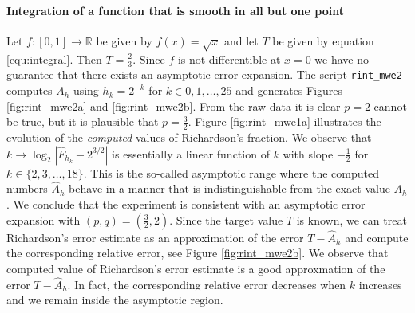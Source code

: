 \documentclass[runningheads]{llncs}
\begin{document}
\paragraph{Integration of a function that is smooth in all but one point}

Let $f : [0,1] \rightarrow \mathbb{R}$ be given by $f(x) = \sqrt{x}$ and let $T$ be given by equation \eqref{equ:integral}.
Then $T = \frac{2}{3}$. Since $f$ is not differentible at $x=0$ we have no guarantee that there exists an asymptotic error expansion.
The script {\tt rint\_mwe2} computes $A_h$ using $h_k = 2^{-k}$ for $k \in {0,1,\dots,25}$ and generates Figures \ref{fig:rint_mwe2a} and \ref{fig:rint_mwe2b}.
From the raw data it is clear $p = 2$ cannot be true, but it is plausible that $p = \frac{3}{2}$.
Figure \ref{fig:rint_mwe1a} illustrates the evolution of the \emph{computed} values of Richardson's fraction.
We observe that $k \rightarrow \log_2|\hat{F}_{h_k} - 2^{3/2}|$ is essentially a linear function of $k$ with slope $-\frac{1}{2}$ for $k \in \{2,3,\dots,18\}$.
This is the so-called asymptotic range where the computed numbers $\hat{A}_h$ behave in a manner that is indistinguishable from the exact value $A_h$.
We conclude that the experiment is consistent with an asymptotic error expansion with $(p,q)=(\tfrac{3}{2},2)$.
Since the target value $T$ is known, we can treat Richardson's error estimate as an approximation of the error $T-\hat{A}_h$ and compute the corresponding relative error, see Figure \ref{fig:rint_mwe2b}.
We observe that computed value of Richardson's error estimate is a good approxmation of the error $T - \hat{A}_h$.
In fact, the corresponding relative error decreases when $k$ increases and we remain inside the asymptotic region.
\end{document}
